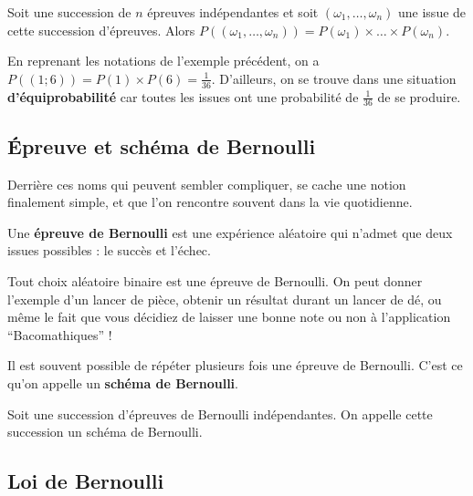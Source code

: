 	\begin{formula}
		Soit une succession de $n$ épreuves indépendantes et soit $(\omega_1, \dots, \omega_n)$ une issue de cette succession d'épreuves. Alors $P((\omega_1, \dots, \omega_n)) = P(\omega_1) \times \dots \times P(\omega_n)$.
	\end{formula}
	
	\begin{tip}[Exemple]
		En reprenant les notations de l'exemple précédent, on a $P((1; 6)) = P(1) \times P(6) = \frac{1}{36}$.
		\newpar
		D'ailleurs, on se trouve dans une situation \textbf{d'équiprobabilité} car toutes les issues ont une probabilité de $\frac{1}{36}$ de se produire.
	\end{tip}
	
	\subsection{Épreuve et schéma de Bernoulli}
	
	Derrière ces noms qui peuvent sembler compliquer, se cache une notion finalement simple, et que l'on rencontre souvent dans la vie quotidienne.
	
	\begin{formula}
		Une \textbf{épreuve de Bernoulli} est une expérience aléatoire qui n'admet que deux issues possibles : le succès et l'échec.
	\end{formula}
	
	\begin{tip}
		Tout choix aléatoire binaire est une épreuve de Bernoulli. On peut donner l'exemple d'un lancer de pièce, obtenir un résultat durant un lancer de dé, ou même le fait que vous décidiez de laisser une bonne note ou non à l'application ``Bacomathiques'' !
	\end{tip}
	
	Il est souvent possible de répéter plusieurs fois une épreuve de Bernoulli. C'est ce qu'on appelle un \textbf{schéma de Bernoulli}.
	
	\begin{formula}
		Soit une succession d'épreuves de Bernoulli indépendantes. On appelle cette succession un schéma de Bernoulli.
	\end{formula}
	
	\subsection{Loi de Bernoulli}
	
